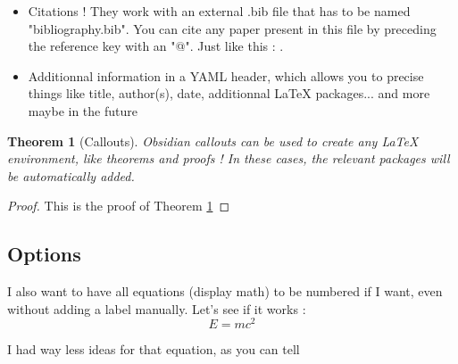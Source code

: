 \documentclass{article}
\newtheorem{theorem}{Theorem}
\begin{document}
\begin{maincontent}
\begin{itemize}
\item 
Citations ! They work with an external .bib file that has to be named "bibliography.bib". You can cite any paper present in this file by preceding the reference key with an "@". Just like this : \cite{Einstein}.

\item 
Additionnal information in a YAML header, which allows you to precise things like title, author(s), date, additionnal LaTeX packages... and more maybe in the future

\end{itemize}
\begin{theorem}[Callouts]

Obsidian callouts can be used to create any LaTeX environment, like theorems and proofs ! In these cases, the relevant packages will be automatically added.
\label{main-theorem}
\end{theorem}
\begin{proof}

This is the proof of Theorem \ref{main-theorem}
\end{proof}

\subsection{Options}

I also want to have all equations (display math) to be numbered if I want, even without adding a label manually. Let's see if it works :
\begin{equation}
	E=mc^2
\end{equation}


I had way less ideas for that equation, as you can tell

\end{maincontent}
\printbibliography
\end{document}
